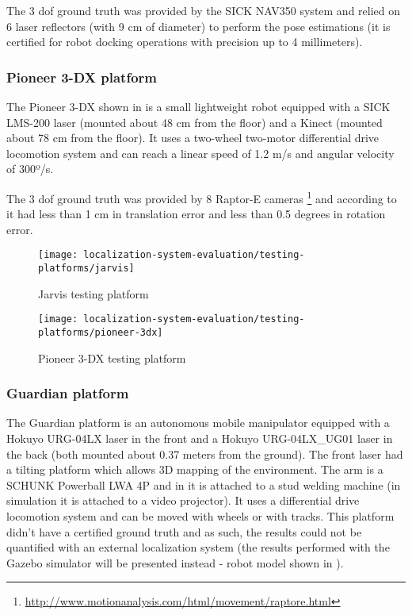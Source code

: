 The 3 \gls{dof} ground truth was provided by the SICK NAV350 system and relied on 6 laser reflectors (with 9 cm of diameter) to perform the pose estimations (it is certified for robot docking operations with precision up to 4 millimeters).


\subsubsection{Pioneer 3-DX platform}

The Pioneer 3-DX shown in  is a small lightweight robot equipped with a SICK LMS-200 laser (mounted about 48 cm from the floor) and a Kinect (mounted about 78 cm from the floor). It uses a two-wheel two-motor differential drive locomotion system and can reach a linear speed of 1.2 m/s and angular velocity of 300º/s.

The 3 \gls{dof} ground truth was provided by 8 Raptor-E cameras \footnote{\url{http://www.motionanalysis.com/html/movement/raptore.html}} and according to \cite{Sturm2012} it had less than 1 cm in translation error and less than 0.5 degrees in rotation error.

\begin{figure}[H]
	\centering
	\begin{minipage}[hb]{0.24\textwidth}
		\centering
		\texttt{[image: localization-system-evaluation/testing-platforms/jarvis]}
		\caption{Jarvis testing platform}
		\label{fig:localization-system-evaluation_jarvis}
	\end{minipage}\hfill
	\begin{minipage}[hb]{0.24\textwidth}
		\centering
		\texttt{[image: localization-system-evaluation/testing-platforms/pioneer-3dx]}
		\caption{Pioneer 3-DX testing platform \cite{Sturm2012}}
		\label{fig:localization-system-evaluation_pioneer}
	\end{minipage}
\end{figure}


\subsubsection{Guardian platform}

The Guardian platform is an autonomous mobile manipulator equipped with a Hokuyo URG-04LX laser in the front and a Hokuyo URG-04LX\_UG01 laser in the back (both mounted about 0.37 meters from the ground). The front laser had a tilting platform which allows 3D mapping of the environment. The arm is a SCHUNK Powerball LWA 4P and in  it is attached to a stud welding machine (in simulation it is attached to a video projector). It uses a differential drive locomotion system and can be moved with wheels or with tracks. This platform didn't have a certified ground truth and as such, the results could not be quantified with an external localization system (the results performed with the Gazebo simulator will be presented instead - robot model shown in ).

